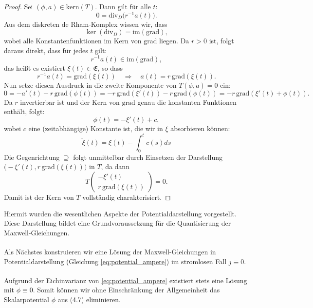 \documentclass[11pt,a4paper,leqno]{report}
\numberwithin{equation}{chapter}
\begin{document}
\begin{proof}
	Sei \((\phi, a) \in \mathrm{kern}(T)\). Dann gilt für alle \(t\):
	\[
	0 = \mathrm{div}_D \bigl(r^{-1} a(t)\bigr).
	\]
	Aus dem diskreten de Rham-Komplex wissen wir, dass
	\[
	\ker(\mathrm{div}_D) = \mathrm{im}(\mathrm{grad}),
	\]
	wobei alle Konstantenfunktionen im Kern von \(\mathrm{grad}\) liegen.
	Da \(r > 0\) ist, folgt daraus direkt, dass für jedes \(t\) gilt:
	\[
	r^{-1} a(t) \in \mathrm{im}(\mathrm{grad}),
	\]
	das heißt es existiert \(\xi(t) \in \mathfrak{E}\), so dass
	\[
	r^{-1} a(t) = \mathrm{grad}(\xi(t)) \quad \Rightarrow \quad a(t) = r\, \mathrm{grad}(\xi(t)).
	\]
	Nun setze diesen Ausdruck in die zweite Komponente von \(T(\phi,a) = 0\) ein:
	\[
	0 = -a'(t) - r\, \mathrm{grad}(\phi(t)) = - r\, \mathrm{grad}(\xi'(t)) - r\, \mathrm{grad}(\phi(t)) = - r\, \mathrm{grad}(\xi'(t) + \phi(t)).
	\]
	Da \(r\) invertierbar ist und der Kern von \(\mathrm{grad}\) genau die konstanten Funktionen enthält, folgt:
	\[
	\phi(t) = - \xi'(t) + c,
	\]
	wobei \(c\) eine (zeitabhängige) Konstante ist, die wir in \(\xi\) absorbieren können:
	\[
	\tilde{\xi}(t) = \xi(t) - \int_{0}^{t}c(s)ds
	\]
	Die Gegenrichtung \(\supseteq\) folgt unmittelbar durch Einsetzen der Darstellung \(\bigl(-\xi'(t), r\, \mathrm{grad}(\xi(t))\bigr)\) in \(T\), da dann
	\[
	T\begin{pmatrix} -\xi'(t) \\ r\, \mathrm{grad}(\xi(t)) \end{pmatrix} = 0.
	\]
	Damit ist der Kern von \(T\) vollständig charakterisiert.
\end{proof}
\noindent
Hiermit wurden die wesentlichen Aspekte der Potentialdarstellung vorgestellt. Diese Darstellung bildet eine Grundvoraussetzung für die Quantisierung der Maxwell-Gleichungen.\\
\\
Als Nächstes konstruieren wir eine Lösung der Maxwell-Gleichungen in Potentialdarstellung (Gleichung \eqref{eq:potential_ampere}) im stromlosen Fall \( j \equiv 0 \).\\
\\
Aufgrund der Eichinvarianz von \eqref{eq:potential_ampere} existiert stets eine Lösung mit \(\phi \equiv 0\). Somit können wir ohne Einschränkung der Allgemeinheit das Skalarpotential \(\phi\) aus (4.7) eliminieren.
\end{document}
